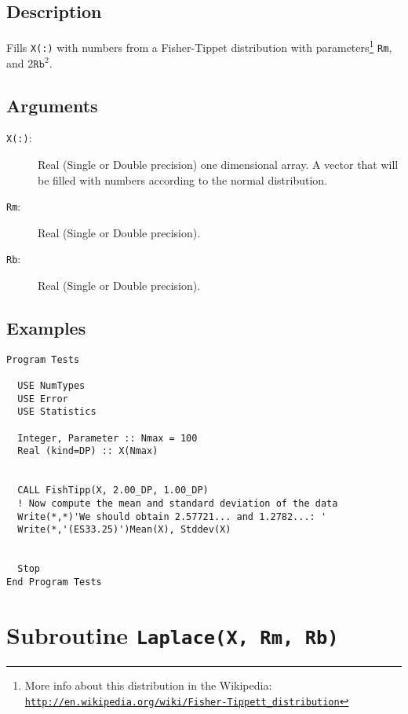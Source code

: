 \subsection{Description}

Fills \texttt{X(:)} with numbers from a Fisher-Tippet distribution with
parameters\footnote{More info about this distribution in the
  Wikipedia: \href{http://en.wikipedia.org/wiki/Fisher-Tippett_distribution}{\texttt{http://en.wikipedia.org/wiki/Fisher-Tippett\_distribution}}} \texttt{Rm}, and $2\mathtt{Rb}^2$.

\subsection{Arguments}

\begin{description}
\item[\texttt{X(:)}:] Real (Single or Double precision) one
  dimensional array. A vector that will be filled with numbers
  according to the normal distribution.
\item[\texttt{Rm}:] Real (Single or Double precision). 
\item[\texttt{Rb}:] Real (Single or Double precision). 
\end{description}

\subsection{Examples}

\begin{lstlisting}[emph=FishTipp,
                   emphstyle=\color{blue},
                   frame=trBL,
                   caption=Obtaining numbers with a Fisher-Tippet distribution.,
                   label=fishtipp]
Program Tests

  USE NumTypes
  USE Error
  USE Statistics

  Integer, Parameter :: Nmax = 100
  Real (kind=DP) :: X(Nmax)


  CALL FishTipp(X, 2.00_DP, 1.00_DP)
  ! Now compute the mean and standard deviation of the data
  Write(*,*)'We should obtain 2.57721... and 1.2782...: '
  Write(*,'(ES33.25)')Mean(X), Stddev(X)


  Stop
End Program Tests
\end{lstlisting}


\section{Subroutine \texttt{Laplace(X, Rm, Rb)}}

